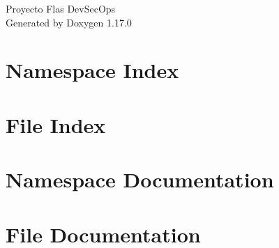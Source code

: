 \documentclass[twoside]{book}
\newcommand{\+}{\discretionary{\mbox{\scriptsize$\hookleftarrow$}}{}{}}
\newcommand{\clearemptydoublepage}{%
    \newpage{\pagestyle{empty}\cleardoublepage}%
  }
\begin{document}
  \raggedbottom
    \hypersetup{pageanchor=false,
                bookmarksnumbered=true,
                pdfencoding=unicode
               }
  \begin{titlepage}
  \vspace*{7cm}
  \begin{center}%
  {\Large Proyecto Flas Dev\+Sec\+Ops}\\
  \vspace*{1cm}
  {\large Generated by Doxygen 1.17.0}\\
  \end{center}
  \end{titlepage}
  \clearemptydoublepage
  \tableofcontents
  \clearemptydoublepage
  \hypersetup{pageanchor=true}

\chapter{Namespace Index}

\chapter{File Index}

\chapter{Namespace Documentation}

\chapter{File Documentation}


  \backmatter
  \newpage
  \clearemptydoublepage
  \printindex
\end{document}
